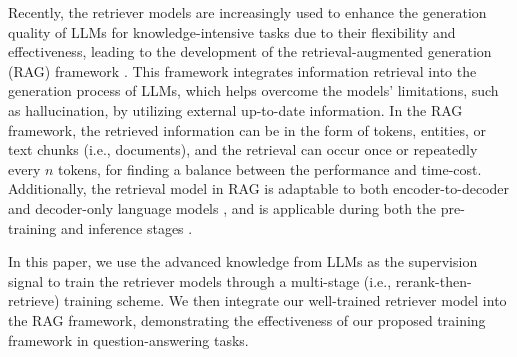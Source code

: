 
Recently, the retriever models are increasingly used to enhance the generation quality of LLMs for knowledge-intensive tasks due to their flexibility and effectiveness, leading to the development of the retrieval-augmented generation (RAG) framework \cite{guu2020retrieval, izacard2023atlas}.
This framework integrates information retrieval into the generation process of LLMs, which helps overcome the models' limitations, such as hallucination, by utilizing external up-to-date information. 
In the RAG framework, the retrieved information can be in the form of tokens, entities, or text chunks (i.e., documents), and the retrieval can occur once or repeatedly every $n$ tokens, for finding a balance between the performance and time-cost.
Additionally, the retrieval model in RAG is adaptable to both encoder-to-decoder \cite{guu2020retrieval, izacard2023atlas} and decoder-only language models \cite{borgeaud2022improving, ram2023context}, and is applicable during both the pre-training \cite{zhong2022training, min2022nonparametric} and inference stages \cite{menick2022teaching, min2023factscore}. 

In this paper, we use the advanced knowledge from LLMs as the supervision signal to train the retriever models through a multi-stage (i.e., rerank-then-retrieve) training scheme.
We then integrate our well-trained retriever model into the RAG framework, 
demonstrating the effectiveness of our proposed training framework in question-answering tasks.


